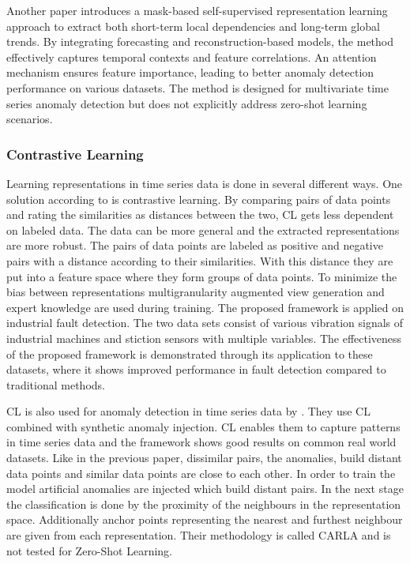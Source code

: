 Another paper introduces a mask-based self-supervised representation learning approach to extract both short-term local dependencies and long-term global trends. By integrating forecasting and reconstruction-based models, the method effectively captures temporal contexts and feature correlations. An attention mechanism ensures feature importance, leading to better anomaly detection performance on various datasets. The method is designed for multivariate time series anomaly detection but does not explicitly address zero-shot learning scenarios.
\cite{miao_unsupervised_2022}

\subsubsection{Contrastive Learning}
Learning representations in time series data is done in several different ways. One solution according to \cite{zhang_debiased_2024} is contrastive learning. By comparing pairs of data points and rating the similarities as distances between the two, CL gets less dependent on labeled data. The data can be more general and the extracted representations are more robust. The pairs of data points are labeled as positive and negative pairs with a distance according to their similarities. With this distance they are put into a feature space where they form groups of data points. To minimize the bias between representations multigranularity augmented view generation and expert knowledge are used during training. The proposed framework is applied on industrial fault detection. The two data sets consist of various vibration signals of industrial machines and stiction sensors with multiple variables. The effectiveness of the proposed framework is demonstrated through its application to these datasets, where it shows improved performance in fault detection compared to traditional methods.

CL is also used for anomaly detection in time series data by \cite{darban_carla_2024}. They use CL combined with synthetic anomaly injection. CL enables them to capture patterns in time series data and the framework shows good results on common real world datasets. Like in the previous paper, dissimilar pairs, the anomalies, build distant data points and similar data points are close to each other. In order to train the model artificial anomalies are injected which build distant pairs. In the next stage the classification is done by  the proximity of the neighbours in the representation space. Additionally anchor points representing the nearest and furthest neighbour are given from each representation. Their methodology is called CARLA and is not tested for Zero-Shot Learning.

